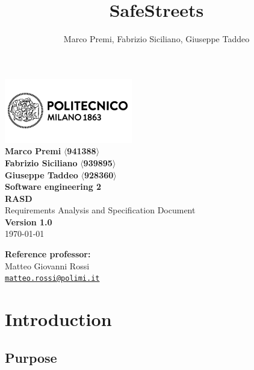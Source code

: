 \documentclass{article}
\title{SafeStreets}
\author{Marco Premi, Fabrizio Siciliano, Giuseppe Taddeo}
\begin{document}
\begin{center}
    \includegraphics[width=0.5\linewidth]{Images/logo_polimi.png}\\[4ex]
    \begingroup
        \huge \textbf{Marco Premi} $\langle$\textbf{941388}$\rangle$ \\
        \vfill
        \huge \textbf{Fabrizio Siciliano} $\langle$\textbf{939895}$\rangle$\\
        \vfill
        \huge \textbf{Giuseppe Taddeo} $\langle$\textbf{928360}$\rangle$\\
        \vfill
    \endgroup
    \vfill
    \begingroup
        \fontsize{15pt}{12pt}\selectfont
        \textbf{Software engineering 2}
    \endgroup\\[3ex]
    \begingroup
        \fontsize{20pt}{12pt}\selectfont \textbf{RASD}\\[1ex]
        \fontsize{15pt}{12pt}\selectfont Requirements Analysis and Specification
        Document \endgroup\\[8ex]
    \normalsize \textbf{Version 1.0}\\\normalsize \today\\
\end{center}

\vspace*{\fill}
\begin{flushright}
    \textbf{Reference professor:}\\[0.2cm]
    Matteo Giovanni Rossi\\[0cm]
    {\small
    \href{mailto:matteo.rossi@polimi.it}{\texttt{matteo.rossi@polimi.it}}}
\end{flushright}

\newpage
\tableofcontents

\newpage
\section{Introduction}
\subsection{Purpose}
\end{document}
